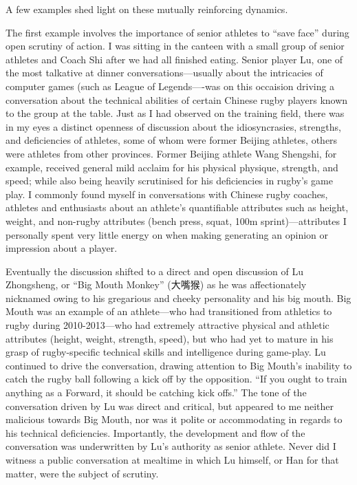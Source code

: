 \begin{CJK}{UTF8}{gbsn}
A few examples shed light on these mutually reinforcing dynamics.

The first example involves the importance of senior athletes to ``save face'' during open scrutiny of action.  I was sitting in the canteen with a small group of senior athletes and Coach Shi after we had all finished eating.  Senior player Lu, one of the most talkative at dinner conversations---usually about the intricacies of computer games (such as League of Legends----was on this occaision driving a conversation about the technical abilities of certain Chinese rugby players known to the group at the table.  Just as I had observed on the training field, there was in my eyes a distinct openness of discussion about the idiosyncrasies, strengths, and deficiencies of athletes, some of whom were former Beijing athletes, others were athletes from other provinces.  Former Beijing athlete Wang Shengshi, for example, received general mild acclaim for his physical physique, strength, and speed; while also being heavily scrutinised for his deficiencies in rugby's game play. I commonly found myself in conversations with Chinese rugby coaches, athletes and enthusiasts about an athlete's quantifiable attributes such as height, weight, and non-rugby attributes (bench press, squat, 100m sprint)---attributes I personally spent very little energy on when making generating an opinion or impression about a player.

Eventually the discussion shifted to a direct and open discussion of Lu Zhongsheng, or ``Big Mouth Monkey'' (大嘴猴) as he was affectionately nicknamed owing to his gregarious and cheeky personality and his big mouth.  Big Mouth was an example of an athlete---who had transitioned from athletics to rugby during 2010-2013---who had extremely attractive physical and athletic attributes (height, weight, strength, speed), but who had yet to mature in his grasp of rugby-specific technical skills and intelligence during game-play.  Lu continued to drive the conversation, drawing attention to Big Mouth's inability to catch the rugby ball following a kick off by the opposition. ``If you ought to train anything as a Forward, it should be catching kick offs.'' The tone of the conversation driven by Lu was direct and critical, but appeared to me neither malicious towards Big Mouth, nor was it polite or accommodating in regards to his technical deficiencies.  Importantly, the development and flow of the conversation was underwritten by Lu's authority as senior athlete.  Never did I witness a public conversation at mealtime in which Lu himself, or Han for that matter, were the subject of scrutiny.


\end{CJK}
